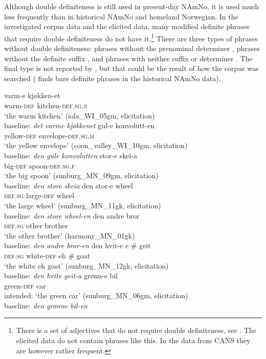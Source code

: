 \documentclass[output=paper]{langscibook}
\begin{document}
Although double definiteness is still used in present-day NAmNo, it is used much less frequently than in historical NAmNo and homeland Norwegian. In the investigated corpus data and the elicited data, many modified definite phrases that require double definiteness do not have it.\footnote{There is a set of adjectives that do not require double definiteness, see . The elicited data do not contain phrases like this. In the data from CANS \citep{ALW2018} they are however rather frequent.} There are three types of phrases without double definiteness: phrases without the prenominal determiner , phrases without the definite suffix , and phrases with neither suffix or determiner . The final type is not reported by \citet{ALW2018}, but that could be the result of how the corpus was searched (\citealt{vanBaal2022New} finds bare definite phrases in the historical NAmNo data).
 

\ea \label{ex:vanbaal:30}
\ea  \label{ex:vanbaal:30a}
\gll varm-e kjøkken-et \\
    warm-\textsc{def} kitchen-\textsc{def.sg.n} \\
\glt `the warm kitchen' (iola\_WI\_05gm, elicitation) \\
baseline: \textit{det varme kjøkkenet} 
\ex\label{ex:vanbaal:30b}
\gll gul-e konvolutt-en \\
    yellow-\textsc{def} envelope-\textsc{def.sg.m} \\
\glt `the yellow envelope' (coon\_valley\_WI\_10gm, elicitation) \\
baseline: \textit{den gule konvolutten}
\ex  \label{ex:vanbaal:30c}
\gll stor-e skei-a \\
    big-\textsc{def} spoon-\textsc{def.sg.f} \\
\glt `the big spoon' (sunburg\_MN\_09gm, elicitation) \\
baseline: \textit{den store skeia}
\z
\ex \label{ex:vanbaal:31}
\ea \label{ex:vanbaal:31a}
\gll den stor-e wheel \\
    \textsc{def.sg} large-\textsc{def} wheel \\
\glt `the large wheel' (sunburg\_MN\_11gk, elicitation) \\
baseline: \textit{den store wheel-en} \footnotemark
\ex \label{ex:vanbaal:31b}
\gll den andre bror \\
    \textsc{def.sg} other brother \\
\glt `the other brother' (harmony\_MN\_01gk) \\
baseline: \textit{den andre bror-en} \citep[755]{ALW2018}
\ex \label{ex:vanbaal:31c}
\gll den hvit-e e \# geit \\
    \textsc{def.sg} white-\textsc{def} eh \# goat \\
\glt `the white eh goat' (sunburg\_MN\_12gk, elicitation) \\
baseline: \textit{den hvite geit-a}
\z
\ex \label{ex:vanbaal:32}
\gll grønn-e bil \\
    green-\textsc{def} car \\
\glt intended: `the green car' (sunburg\_MN\_06gm, elicitation) \\
baseline: \textit{den grønne bil-en}
\z\largerpage
\end{document}
